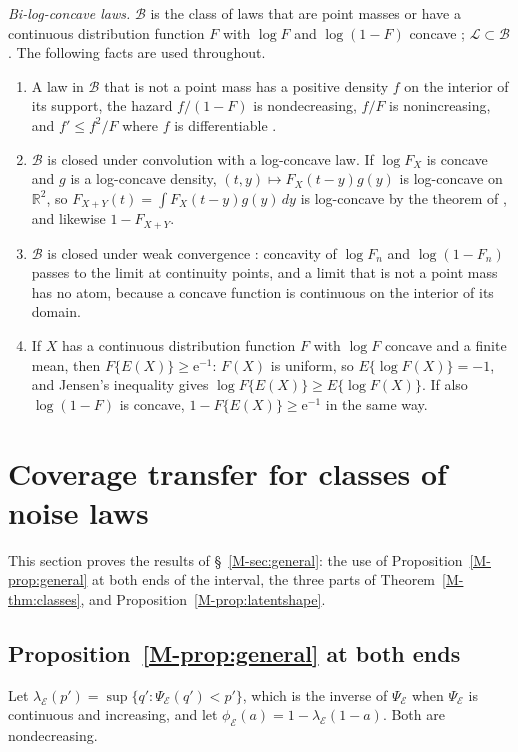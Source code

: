 \documentclass[11pt]{article}
\renewcommand{\_}{\usc\allowbreak}
\newcommand{\LC}{\mathcal{L}}
\begin{document}
\emph{Bi-log-concave laws.} $\mathcal B$ is the class of laws that are point masses or have a continuous distribution function $F$ with $\log F$ and $\log(1-F)$ concave \citep{dumbgen2017}; $\LC \subset \mathcal B$. The following facts are used throughout.
\begin{enumerate}
\item A law in $\mathcal B$ that is not a point mass has a positive density $f$ on the interior of its support, the hazard $f/(1 - F)$ is nondecreasing, $f/F$ is nonincreasing, and $f' \le f^2/F$ where $f$ is differentiable \citep{dumbgen2017}.
\item $\mathcal B$ is closed under convolution with a log-concave law. If $\log F_X$ is concave and $g$ is a log-concave density, $(t, y) \mapsto F_X(t - y)g(y)$ is log-concave on $\mathbb R^2$, so $F_{X+Y}(t) = \int F_X(t-y)g(y)\,dy$ is log-concave by the theorem of \citet{prekopa1973}, and likewise $1 - F_{X+Y}$.
\item $\mathcal B$ is closed under weak convergence \citep{saumard2019}: concavity of $\log F_n$ and $\log(1-F_n)$ passes to the limit at continuity points, and a limit that is not a point mass has no atom, because a concave function is continuous on the interior of its domain.
\item If $X$ has a continuous distribution function $F$ with $\log F$ concave and a finite mean, then $F\{E(X)\} \ge \mathrm{e}^{-1}$: $F(X)$ is uniform, so $E\{\log F(X)\} = -1$, and Jensen's inequality gives $\log F\{E(X)\} \ge E\{\log F(X)\}$. If also $\log(1 - F)$ is concave, $1 - F\{E(X)\} \ge \mathrm{e}^{-1}$ in the same way.
\end{enumerate}

\section{Coverage transfer for classes of noise laws}\label{sec:s-general}

This section proves the results of \S~\ref{M-sec:general}: the use of Proposition~\ref{M-prop:general} at both ends of the interval, the three parts of Theorem~\ref{M-thm:classes}, and Proposition~\ref{M-prop:latentshape}.

\subsection*{Proposition~\ref{M-prop:general} at both ends}

Let $\lambda_{\mathcal E}(p') = \sup\{q' : \Psi_{\mathcal E}(q') < p'\}$, which is the inverse of $\Psi_{\mathcal E}$ when $\Psi_{\mathcal E}$ is continuous and increasing, and let $\phi_{\mathcal E}(a) = 1 - \lambda_{\mathcal E}(1 - a)$. Both are nondecreasing.
\end{document}
